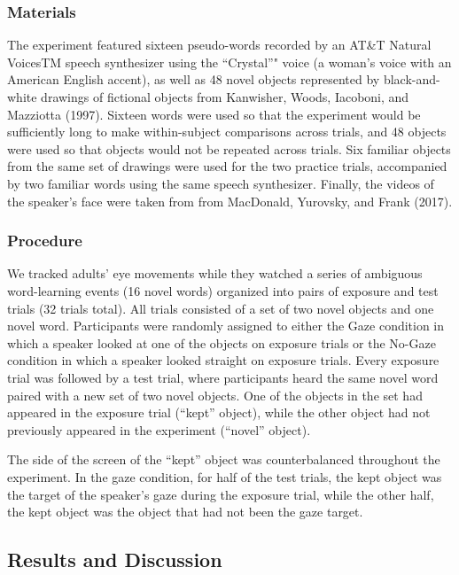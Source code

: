 \documentclass[man,floatsintext]{apa6}
\theoremstyle{definition}
\theoremstyle{definition}
\theoremstyle{definition}
\theoremstyle{remark}
\begin{document}
\subsubsection{Materials}\label{materials-1}

The experiment featured sixteen pseudo-words recorded by an AT\&T
Natural VoicesTM speech synthesizer using the \enquote{Crystal}" voice
(a woman's voice with an American English accent), as well as 48 novel
objects represented by black-and-white drawings of fictional objects
from Kanwisher, Woods, Iacoboni, and Mazziotta (1997). Sixteen words
were used so that the experiment would be sufficiently long to make
within-subject comparisons across trials, and 48 objects were used so
that objects would not be repeated across trials. Six familiar objects
from the same set of drawings were used for the two practice trials,
accompanied by two familiar words using the same speech synthesizer.
Finally, the videos of the speaker's face were taken from from
MacDonald, Yurovsky, and Frank (2017).

\subsubsection{Procedure}\label{procedure-1}

We tracked adults' eye movements while they watched a series of
ambiguous word-learning events (16 novel words) organized into pairs of
exposure and test trials (32 trials total). All trials consisted of a
set of two novel objects and one novel word. Participants were randomly
assigned to either the Gaze condition in which a speaker looked at one
of the objects on exposure trials or the No-Gaze condition in which a
speaker looked straight on exposure trials. Every exposure trial was
followed by a test trial, where participants heard the same novel word
paired with a new set of two novel objects. One of the objects in the
set had appeared in the exposure trial (\enquote{kept} object), while
the other object had not previously appeared in the experiment
(\enquote{novel} object).

The side of the screen of the \enquote{kept} object was counterbalanced
throughout the experiment. In the gaze condition, for half of the test
trials, the kept object was the target of the speaker's gaze during the
exposure trial, while the other half, the kept object was the object
that had not been the gaze target.

\subsection{Results and Discussion}\label{results-and-discussion-1}
\end{document}
